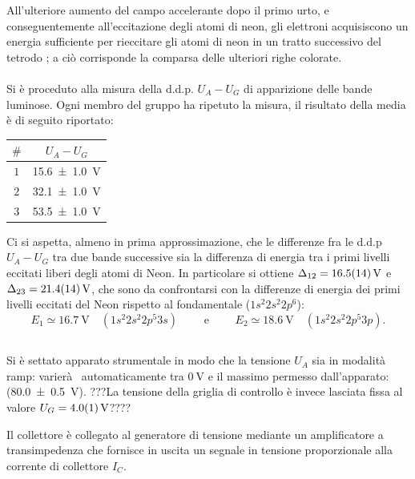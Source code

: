 		All'ulteriore aumento del campo accelerante dopo il
		primo urto, e conseguentemente all'eccitazione degli
		atomi di neon, gli elettroni acquisiscono un energia
		sufficiente per rieccitare gli atomi
		di neon in un tratto successivo del tetrodo ;
		a ciò corrisponde la comparsa delle ulteriori righe colorate.
\paragraph{}
	Si è proceduto alla misura della d.d.p. $U_A-U_G$ di apparizione delle bande luminose. Ogni membro del gruppo ha ripetuto la misura, il risultato della media è di seguito riportato:

	\begin{table}[H]
 		\centering
		\begin{tabular}{cc}
 			\toprule
 			$\#$  &  $U_A- U_G$\\
  			\midrule
  			$1$ & \SI{15.6 \pm 1.0}{\volt}\\
  			$2$ &  \SI{32.1 \pm 1.0}{\volt}\\
  			$3$ & \SI{53.5 \pm 1.0}{\volt}\\
  			\bottomrule
 		\end{tabular}
	\label{tab:a}
	\end{table}



	Ci si aspetta, almeno in prima approssimazione, che le differenze fra le d.d.p $U_A-U_G$ tra due bande successive sia la differenza di energia tra i primi livelli eccitati liberi degli atomi di Neon.
	In particolare si ottiene $\Delta_{12} = \SI{16.5 \pm 1.4}{\volt}$ e $\Delta_{23} = \SI{21.4 \pm 1.4}{\volt}$, che sono da confrontarsi con la differenze di energia dei primi livelli eccitati del Neon rispetto al fondamentale ($1s^2 2s^2 2p^6$):
	$$E_1 \simeq \SI{16.7}{\volt} \quad (1s^2 2s^2 2p^5 3s) \qquad \text{ e } \qquad E_2 \simeq \SI{18.6}{\volt} \quad (1s^2 2s^2 2p^5 3p).$$

\subsection{}
	Si è settato apparato strumentale in modo che
	la tensione $U_A$ sia in modalità  ramp: varierà  automaticamente tra $\SI{0}{\volt}$ e il massimo permesso dall'apparato:
	(\SI{80.0 \pm 0.5}{\volt}). ???La tensione della griglia di controllo è invece lasciata fissa al valore $U_G = \SI{4.0 \pm 0.1}{\volt}$????

Il collettore è collegato al generatore di tensione mediante un amplificatore a transimpedenza
	che fornisce in uscita un segnale in tensione proporzionale alla corrente di collettore $I_C$.

